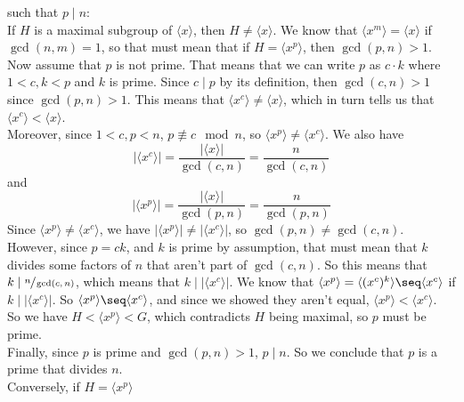 \documentclass[12pt]{article}
\begin{document}
\begin{enumerate}[label=\textbf{\alph*.}]
            such that $p \mid n$: \\
            If $H$ is a maximal subgroup of $\langle x \rangle$,
            then $H \neq \langle x \rangle$.
            We know that $\langle x^m \rangle = \langle x \rangle$
            if $\gcd(n, m) = 1$,
            so that must mean that if $H = \langle x^p \rangle$,
            then $\gcd(p, n) > 1$. \\
            Now assume that $p$ is not prime.
            That means that we can write $p$ as $c \cdot k$
            where $1 < c, k < p$ and $k$ is prime.
            Since $c \mid p$ by its definition,
            then $\gcd(c, n) > 1$ since $\gcd(p, n) > 1$.
            This means that $\langle x^c \rangle \neq \langle x \rangle$,
            which in turn tells us that 
            $\langle x^c \rangle < \langle x \rangle$. \\
            Moreover, since $1 < c, p < n$,
            $p \not\equiv c \mod n$,
            so $\langle x^p \rangle \neq \langle x^c \rangle$.
            We also have
            \[ |\langle x^c \rangle|
            = \dfrac{|\langle x \rangle|}{\gcd(c, n)} 
            = \dfrac{n}{\gcd(c, n)} \]
            and 
            \[ |\langle x^p \rangle|
            = \dfrac{|\langle x \rangle|}{\gcd(p, n)} 
            = \dfrac{n}{\gcd(p, n)} \]
            Since $\langle x^p \rangle \neq \langle x^c \rangle$,
            we have $|\langle x^p \rangle| \neq |\langle x^c \rangle|$,
            so $\gcd(p, n) \neq \gcd(c, n)$.
            However, since $p = ck$, and $k$ is prime by assumption,
            that must mean that $k$ divides some factors of $n$
            that aren't part of $\gcd(c, n)$.
            So this means that $k \mid \sfrac{n}{\gcd(c, n)}$,
            which means that $k \mid |\langle x^c \rangle|$.
            We know that
            $\langle x^p \rangle = \langle (x^c)^k \rangle
            \seq \langle x^c \rangle$
            if $k \mid |\langle x^c \rangle|$.
            So $\langle x^p \rangle \seq \langle x^c \rangle$,
            and since we showed they aren't equal,
            $\langle x^p \rangle < \langle x^c \rangle$. \\
            So we have $H < \langle x^p \rangle < G$,
            which contradicts $H$ being maximal,
            so $p$ must be prime. \\
            Finally, since $p$ is prime and $\gcd(p, n) > 1$,
            $p \mid n$.
            So we conclude that $p$ is a prime that divides $n$. \\
            Conversely, if $H = \langle x^p \rangle$

\end{enumerate}
\end{document}
